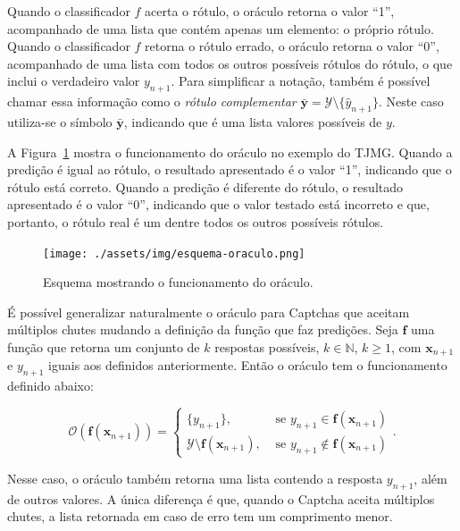 \documentclass[12pt,twoside,brazilian]{book}
\begin{document}
Quando o classificador \(f\) acerta o rótulo, o oráculo retorna o valor
``1'', acompanhado de uma lista que contém apenas um elemento: o próprio
rótulo. Quando o classificador \(f\) retorna o rótulo errado, o oráculo
retorna o valor ``0'', acompanhado de uma lista com todos os outros
possíveis rótulos do rótulo, o que inclui o verdadeiro valor
\(y_{n+1}\). Para simplificar a notação, também é possível chamar essa
informação como o \emph{rótulo complementar}
\(\bar{\mathbf y} = \mathcal Y \setminus \{ \hat {y}_{n+1}\}\). Neste
caso utiliza-se o símbolo \(\bar{\mathbf y}\), indicando que é uma lista
valores possíveis de \(y\).

A Figura~\ref{fig-esquema-oraculo} mostra o funcionamento do oráculo no
exemplo do TJMG. Quando a predição é igual ao rótulo, o resultado
apresentado é o valor ``1'', indicando que o rótulo está correto. Quando
a predição é diferente do rótulo, o resultado apresentado é o valor
``0'', indicando que o valor testado está incorreto e que, portanto, o
rótulo real é um dentre todos os outros possíveis rótulos.

\begin{figure}

{\centering \texttt{[image: ./assets/img/esquema-oraculo.png]}

}

\caption{\label{fig-esquema-oraculo}Esquema mostrando o funcionamento do
oráculo.}

\end{figure}

É possível generalizar naturalmente o oráculo para Captchas que aceitam
múltiplos chutes mudando a definição da função que faz predições. Seja
\(\mathbf f\) uma função que retorna um conjunto de \(k\) respostas
possíveis, \(k\in \mathbb N\), \(k\geq 1\), com \(\mathbf x_{n+1}\) e
\(y_{n+1}\) iguais aos definidos anteriormente. Então o oráculo tem o
funcionamento definido abaixo:

\[
\mathcal O(\mathbf f(\mathbf x_{n+1})) = \left\{\begin{array}{ll}
    \{y_{n+1}\}, & \text{ se } y_{n+1} \in \mathbf f(\mathbf x_{n+1})  \\
   \mathcal Y \setminus \mathbf f(\mathbf x_{n+1}), & \text{ se } y_{n+1} \notin \mathbf f(\mathbf x_{n+1})
\end{array}\right..
\]

Nesse caso, o oráculo também retorna uma lista contendo a resposta
\(y_{n+1}\), além de outros valores. A única diferença é que, quando o
Captcha aceita múltiplos chutes, a lista retornada em caso de erro tem
um comprimento menor.
\end{document}
